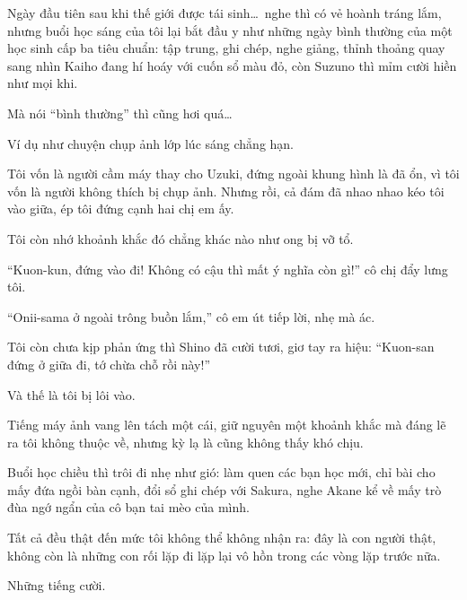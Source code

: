\documentclass[../main.tex]{subfiles}
\begin{document}


Ngày đầu tiên sau khi thế giới được tái sinh\dots\ nghe thì có vẻ hoành tráng lắm, nhưng buổi học sáng của tôi lại bắt đầu y như những ngày bình thường của một học sinh cấp ba tiêu chuẩn: tập trung, ghi chép, nghe giảng, thỉnh thoảng quay sang nhìn Kaiho đang hí hoáy với cuốn sổ màu đỏ, còn Suzuno thì mỉm cười hiền như mọi khi.

Mà nói ``bình thường'' thì cũng hơi quá\dots

Ví dụ như chuyện chụp ảnh lớp lúc sáng chẳng hạn.

Tôi vốn là người cầm máy thay cho Uzuki, đứng ngoài khung hình là đã ổn, vì tôi vốn là người không thích bị chụp ảnh. Nhưng rồi, cả đám đã nhao nhao kéo tôi vào giữa, ép tôi đứng cạnh hai chị em ấy.

Tôi còn nhớ khoảnh khắc đó chẳng khác nào như ong bị vỡ tổ.

``Kuon-kun, đứng vào đi! Không có cậu thì mất ý nghĩa còn gì!'' cô chị đẩy lưng tôi.

``Onii-sama ở ngoài trông buồn lắm,'' cô em út tiếp lời, nhẹ mà ác.

Tôi còn chưa kịp phản ứng thì Shino đã cười tươi, giơ tay ra hiệu: ``Kuon-san đứng ở giữa đi, tớ chừa chỗ rồi này!''

Và thế là tôi bị lôi vào.

Tiếng máy ảnh vang lên tách một cái, giữ nguyên một khoảnh khắc mà đáng lẽ ra tôi không thuộc về, nhưng kỳ lạ là cũng không thấy khó chịu.

Buổi học chiều thì trôi đi nhẹ như gió: làm quen các bạn học mới, chỉ bài cho mấy đứa ngồi bàn cạnh, đổi sổ ghi chép với Sakura, nghe Akane kể về mấy trò đùa ngớ ngẩn của cô bạn tai mèo của mình.

Tất cả đều thật đến mức tôi không thể không nhận ra: đây là con người thật, không còn là những con rối lặp đi lặp lại vô hồn trong các vòng lặp trước nữa.

Những tiếng cười.
\end{document}
